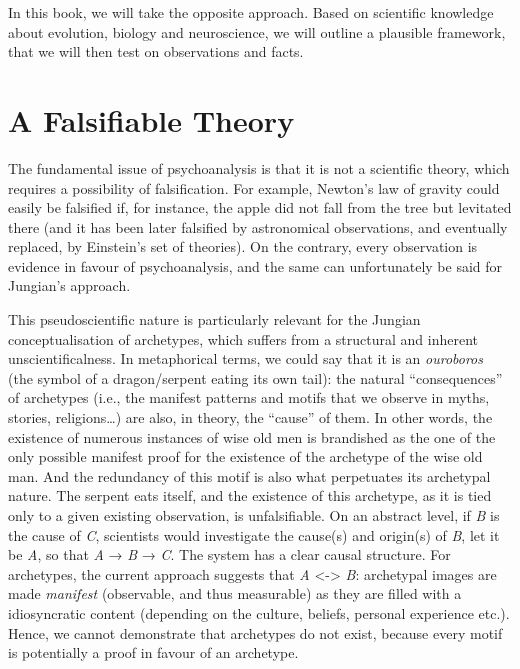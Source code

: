 \documentclass[
]{book}
\begin{document}
In this book, we will take the opposite approach. Based on scientific knowledge about evolution, biology and neuroscience, we will outline a plausible framework, that we will then test on observations and facts.

\hypertarget{a-falsifiable-theory}{%
\section{A Falsifiable Theory}\label{a-falsifiable-theory}}

The fundamental issue of psychoanalysis is that it is not a scientific theory, which requires a possibility of falsification. For example, Newton's law of gravity could easily be falsified if, for instance, the apple did not fall from the tree but levitated there (and it has been later falsified by astronomical observations, and eventually replaced, by Einstein's set of theories). On the contrary, every observation is evidence in favour of psychoanalysis, and the same can unfortunately be said for Jungian's approach.

This pseudoscientific nature is particularly relevant for the Jungian conceptualisation of archetypes, which suffers from a structural and inherent unscientificalness. In metaphorical terms, we could say that it is an \emph{ouroboros} (the symbol of a dragon/serpent eating its own tail): the natural ``consequences'' of archetypes (i.e., the manifest patterns and motifs that we observe in myths, stories, religions\ldots) are also, in theory, the ``cause'' of them. In other words, the existence of numerous instances of wise old men is brandished as the one of the only possible manifest proof for the existence of the archetype of the wise old man. And the redundancy of this motif is also what perpetuates its archetypal nature. The serpent eats itself, and the existence of this archetype, as it is tied only to a given existing observation, is unfalsifiable. On an abstract level, if \emph{B} is the cause of \emph{C}, scientists would investigate the cause(s) and origin(s) of \emph{B}, let it be \emph{A}, so that \emph{A} → \emph{B} → \emph{C}. The system has a clear causal structure. For archetypes, the current approach suggests that \emph{A} \textless-\textgreater{} \emph{B}: archetypal images are made \emph{manifest} (observable, and thus measurable) as they are filled with a idiosyncratic content (depending on the culture, beliefs, personal experience etc.). Hence, we cannot demonstrate that archetypes do not exist, because every motif is potentially a proof in favour of an archetype.
\end{document}
